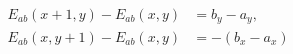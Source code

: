 \documentclass[border=6pt]{standalone}
\begin{document}
\color{black}
\(\displaystyle
\begin{aligned}
E_{ab}(x+1,y)-E_{ab}(x,y) &= b_y-a_y,\\
E_{ab}(x,y+1)-E_{ab}(x,y) &= -(b_x-a_x)
\end{aligned}
\)
\end{document}
